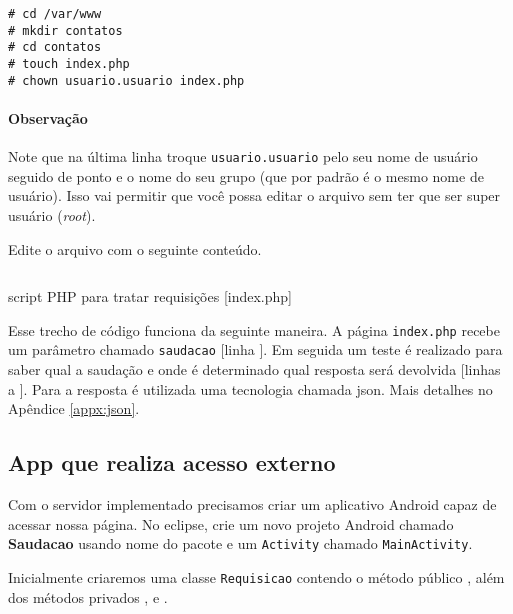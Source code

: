 \begin{flushleft}\texttt{\# cd /var/www\\
\# mkdir contatos\\
\# cd contatos\\
\# touch index.php\\
\# chown usuario.usuario index.php\\}
\end{flushleft}

\paragraph{Observação}

Note que na última linha troque \texttt{usuario.usuario} pelo seu nome de
usuário seguido de ponto e o nome do seu grupo (que por padrão é o mesmo nome de usuário). Isso vai
permitir que você possa editar o arquivo sem ter que ser super usuário (\textit{root}).

Edite o arquivo com o seguinte conteúdo.

\begin{listing}[H]
  \inputminted[linenos=true,frame=bottomline,tabsize=3]{ php }{ source/index-1.php }
  \caption{script PHP para tratar requisições [index.php]}
\end{listing}

Esse trecho de código funciona da seguinte maneira. A página \texttt{index.php} recebe um parâmetro
chamado \texttt{saudacao} [linha ]. Em seguida um teste é realizado para saber qual a
saudação e onde é determinado qual resposta será devolvida [linhas  a ].
Para a resposta é utilizada uma tecnologia chamada \gls{json}. Mais detalhes no Apêndice \ref{appx:json}.


\subsection{App que realiza acesso externo}

Com o servidor implementado precisamos criar um aplicativo Android capaz de acessar nossa página.
No eclipse, crie um novo projeto Android chamado \textbf{Saudacao} usando nome do pacote
 e um \texttt{Activity} chamado \texttt{MainActivity}.

Inicialmente criaremos uma classe \texttt{Requisicao} contendo o método público ,
além dos métodos privados ,  e .

